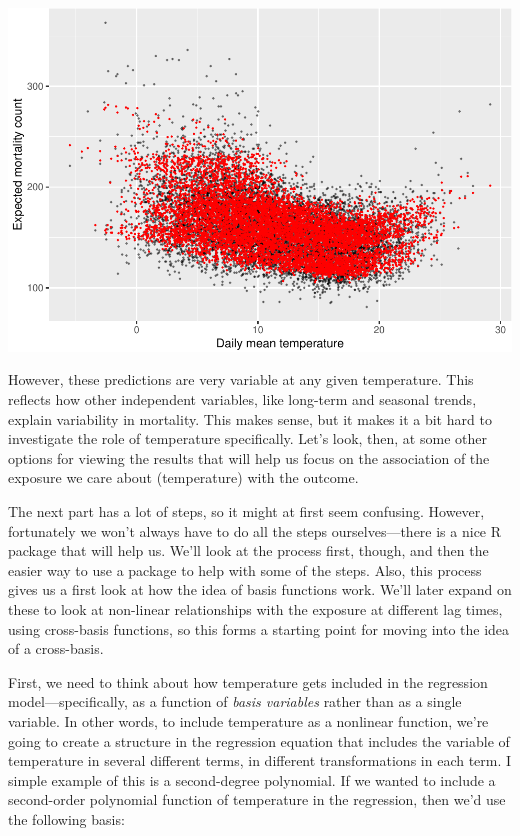 \documentclass[
]{book}
\begin{document}
\includegraphics{adv_epi_analysis_files/figure-latex/unnamed-chunk-61-1.pdf}

However, these predictions are very variable at any given temperature. This reflects how
other independent variables, like long-term and seasonal trends, explain variability in
mortality. This makes sense, but it makes it a bit hard to investigate the role of temperature
specifically. Let's look, then, at some other options for viewing the results that will
help us focus on the association of the exposure we care about (temperature) with the outcome.

The next part has a lot of steps, so it might at first seem confusing. However, fortunately
we won't always have to do all the steps ourselves---there is a nice R package that
will help us. We'll look at the process first, though, and then the easier way to use a
package to help with some of the steps. Also, this process gives us a first look at how
the idea of basis functions work. We'll later expand on these to look at non-linear
relationships with the exposure at different lag times, using cross-basis functions, so this
forms a starting point for moving into the idea of a cross-basis.

First, we need to think about how temperature gets included in the regression
model---specifically, as a function of \emph{basis variables} rather than as a single variable.
In other words, to include temperature as a nonlinear function, we're going to create
a structure in the regression equation that includes the variable of temperature in
several different terms, in different transformations in each term. I simple example of this
is a second-degree polynomial. If we wanted to include a second-order polynomial function
of temperature in the regression, then we'd use the following basis:
\end{document}
